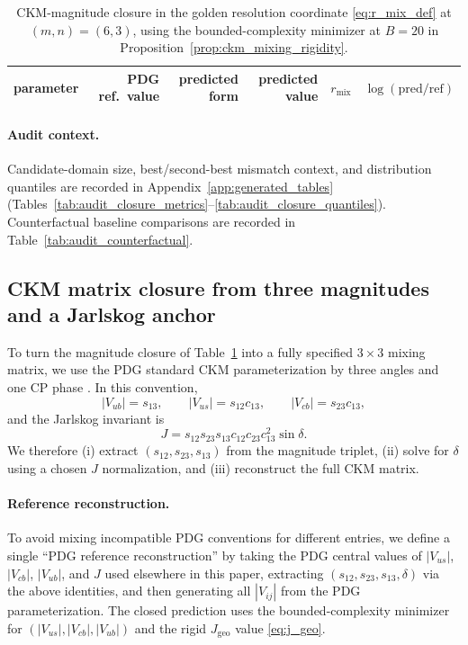 \begin{table}[t]
\centering
\small
\setlength{\tabcolsep}{6pt}
\renewcommand{\arraystretch}{1.15}
\begin{tabular}{lrrrrr}
\toprule
parameter & PDG ref.\ value & predicted form & predicted value & $r_{\mathrm{mix}}$ & $\log(\mathrm{pred}/\mathrm{ref})$ \\
\midrule
%
\end{tabular}
\caption{CKM-magnitude closure in the golden resolution coordinate \eqref{eq:r_mix_def} at $(m,n)=(6,3)$, using the bounded-complexity minimizer at $B=20$ in Proposition~\ref{prop:ckm_mixing_rigidity}.}
\label{tab:ckm_mixing}
\end{table}

\paragraph{Audit context.}
Candidate-domain size, best/second-best mismatch context, and distribution quantiles are recorded in Appendix~\ref{app:generated_tables} (Tables~\ref{tab:audit_closure_metrics}--\ref{tab:audit_closure_quantiles}).
Counterfactual baseline comparisons are recorded in Table~\ref{tab:audit_counterfactual}.

\subsection{CKM matrix closure from three magnitudes and a Jarlskog anchor}
\label{subsec:ckm_matrix_closure}

To turn the magnitude closure of Table~\ref{tab:ckm_mixing} into a fully specified $3\times 3$ mixing matrix, we use the PDG standard CKM parameterization by three angles and one CP phase \cite{PDGRPP2024}.
In this convention,
\[
|V_{ub}|=s_{13},\qquad |V_{us}|=s_{12}c_{13},\qquad |V_{cb}|=s_{23}c_{13},
\]
and the Jarlskog invariant is
\[
J=s_{12}s_{23}s_{13}c_{12}c_{23}c_{13}^2\sin\delta.
\]
We therefore (i) extract $(s_{12},s_{23},s_{13})$ from the magnitude triplet, (ii) solve for $\delta$ using a chosen $J$ normalization, and (iii) reconstruct the full CKM matrix.

\paragraph{Reference reconstruction.}
To avoid mixing incompatible PDG conventions for different entries, we define a single ``PDG reference reconstruction'' by taking the PDG central values of $|V_{us}|$, $|V_{cb}|$, $|V_{ub}|$, and $J$ used elsewhere in this paper, extracting $(s_{12},s_{23},s_{13},\delta)$ via the above identities, and then generating all $|V_{ij}|$ from the PDG parameterization.
The closed prediction uses the bounded-complexity minimizer for $(|V_{us}|,|V_{cb}|,|V_{ub}|)$ and the rigid $J_{\mathrm{geo}}$ value \eqref{eq:j_geo}.

